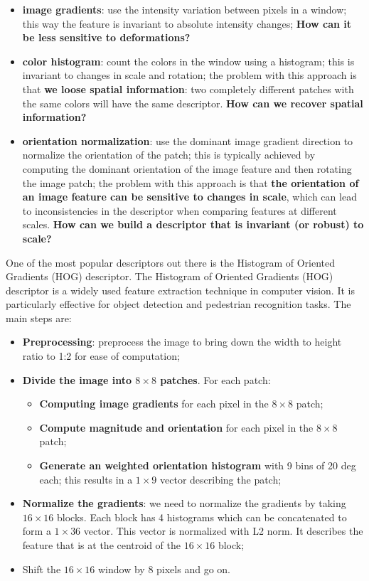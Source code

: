 \documentclass{article}
\begin{document}
\begin{itemize}
    \item \textbf{image gradients}: use the intensity variation between pixels in a window; this way the feature is invariant to absolute intensity changes; \textbf{How can it be less sensitive to deformations?}
    \item \textbf{color histogram}: count the colors in the window using a histogram; this is invariant to changes in scale and rotation; the problem with this approach is that \textbf{we loose spatial information}: two completely different patches with the same colors will have the same descriptor. \textbf{How can we recover spatial information?}
    \item \textbf{orientation normalization}: use the dominant image gradient direction to normalize the orientation of the patch; this is typically achieved by computing the dominant orientation of the image feature and then rotating the image patch; the problem with this approach is that \textbf{the orientation of an image feature can be sensitive to changes in scale}, which can lead to inconsistencies in the descriptor when comparing features at different scales. \textbf{How can we build a descriptor that is invariant (or robust) to scale?}
\end{itemize}

One of the most popular descriptors out there is the Histogram of Oriented Gradients (HOG) descriptor. The Histogram of Oriented Gradients (HOG) descriptor is a widely used feature extraction technique in computer vision. It is particularly effective for object detection and pedestrian recognition tasks. The main steps are:

\begin{itemize}
    \item \textbf{Preprocessing}: preprocess the image to bring down the width to height ratio to 1:2 for ease of computation;
    \item \textbf{Divide the image into $8 \times 8$ patches}. For each patch:
    \begin{itemize}
        \item \textbf{Computing image gradients} for each pixel in the $8 \times 8$ patch;
        \item \textbf{Compute magnitude and orientation} for each pixel in the $8 \times 8$ patch;
        \item \textbf{Generate an weighted orientation histogram} with 9 bins of 20 deg each; this results in a $1 \times 9$ vector describing the patch;
    \end{itemize}
    \item \textbf{Normalize the gradients}: we need to normalize the gradients by taking $16 \times 16$ blocks. Each block has 4 histograms which can be concatenated to form a $1 \times 36$ vector.
    This vector is normalized with L2 norm. It describes the feature that is at the centroid of the $16 \times 16$ block;
    \item Shift the $16 \times 16$ window by 8 pixels and go on. 
\end{itemize}
\end{document}
